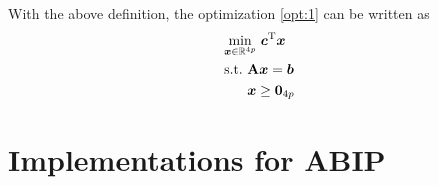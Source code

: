 With the above definition, the optimization \eqref{opt:1} can be written as
\begin{align*}
     & \underset{\boldsymbol{x}\in{\mathbb R}^{4p}}{\min}~ \boldsymbol{c}^{\rm T}\boldsymbol{x}
    \\
     & \begin{aligned}
        \text{s.t.}~ & {\bf A}\boldsymbol{x} = \boldsymbol{b}
        \\
                     & \boldsymbol{x} \geq \boldsymbol{0}_{4p}
    \end{aligned}
\end{align*}

\section{Implementations for ABIP}